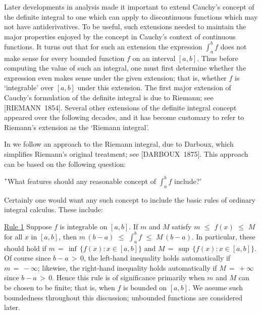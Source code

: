         Later developments in analysis made it important to extend Cauchy's concept of the definite integral
    to one which can apply to discontinuous functions which may not have antiderivatives.
    To be useful, such extensions needed to maintain the major properties enjoyed by the concept in Cauchy's context of continuous functions.
    It turns out that for such an extension the expression ${\displaystyle \int_{a}^{b} f}$
    does not make sense for every bounded function $f$ on an interval $[a,b]$. Thus before computing the value of such an integral,
    one must first determine whether the expression even makes sense under the given extension;
    that is, whether $f$ is `integrable' over $[a,b]$ under this extension. The first major extension
    of Cauchy's formulation of the definite integral is due to Riemann; see [RIEMANN~1854].
    Several other extensions of the definite integral concept appeared over the following decades,
    and it has become customary to refer to Riemann's extension as the `Riemann integral'.


        In {\ThisText} we follow an approach to the Riemann integral, due to Darboux, which simplifies Riemann's original treatment; see [DARBOUX~1875].
    This approach can be based on the following question:

\VA

        \h `What features should any reasonable concept of ${\displaystyle \int_{a}^{b} f}$ include?'

\VA

        Certainly one would want any such concept to include the basic rules of ordinary integral calculus. These include:

\V
        \underline{Rule 1} Suppose $f$ is integrable on $[a,b]$. If $m$ and $M$ satisfy $m\,\,{\leq}\,\,f(x)\,\,{\leq}\,\,M$ for all $x$ in $[a,b]$,
    then  ${\displaystyle m\,(b-a)\,\,{\leq}\,\,\int_{a}^{b} f\,\,{\leq}\,\,M\,(b-a)}$.
    In particular, these should hold if $m \,=\, {\inf}\,\{f(x): x{\in}[a,b]\}$ and $M \,=\, {\sup}\,\{f(x): x{\in}[a,b]\}$.
    Of course since $b-a\,>\,0$, the left-hand inequality holds automatically if $m \,=\, -{\infty}$;
    likewise, the right-hand inequality holds automatically if $M \,=\, +{\infty}$ since $b-a\,>\,0$.
    Hence this rule is of significance primarily when $m$ and $M$ can be chosen to be finite;
    that is, when $f$ is bounded on $[a,b]$. We assume such boundedness throughout this discussion; unbounded functions are considered later.

\VA

